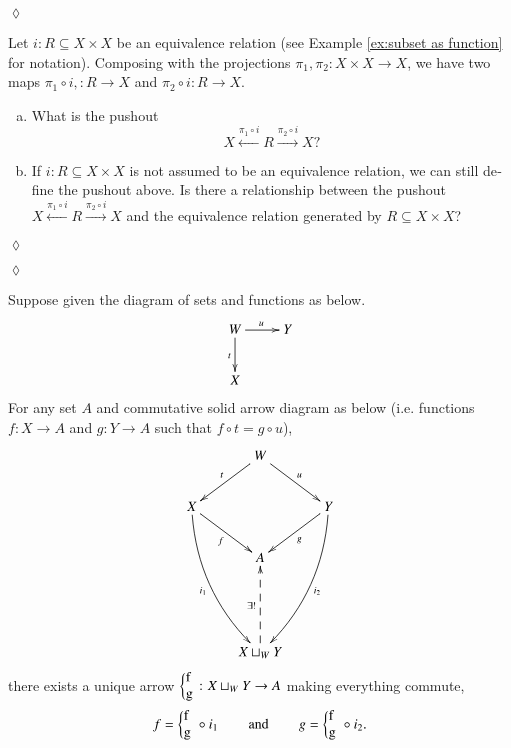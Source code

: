 \documentclass[a4paper]{book}
\def\hsp{\hspace{.3in}}
\def\to{\rightarrow}
\def\taking{\colon}
\def\ss{\subseteq}
\newcommand{\To}[1]{\xrightarrow{#1}}
\newcommand{\From}[1]{\xleftarrow{#1}}
\newcommand{\coprodmap}[2]{{\left\{\parbox{.1in}{#1\\#2}\right.}}
\newcommand{\po}[3]{\coprodmap{#1}{#2}}
\theoremstyle{myth}
\newtheorem{lemmaENG}[envENG]{\begin{english}Lemma\end{english}}
\newtheorem{excENG}[envENG]{\begin{english}Exercise\end{english}}
\newenvironment{exerciseENG}{\begin{excENG}}{\hspace*{\fill}$\lozenge$\end{excENG}}
\newtheorem{lemmaRUS}[envRUS]{\begin{russian}Лемма\end{russian}}
\newtheorem{excRUS}[envRUS]{\begin{russian}Упражнение\end{russian}}
\newenvironment{exerciseRUS}{\begin{excRUS}}{\hspace*{\fill}$\lozenge$\end{excRUS}}
\def\sexc{\begin{enumerate}[a.)]\setlength{\itemsep}{.1cm}\setlength{\parskip}{.1cm}\item}
\def\next{\item}
\def\endsexc{\end{enumerate}}
\begin{document}
\begin{english}
\begin{exerciseRUS}
\begin{russian} \end{russian}
\end{exerciseRUS}

\begin{exerciseENG}
Let $i\taking R\ss X\times X$ be an equivalence relation (see Example \ref{ex:subset as function} for notation). Composing with the projections $\pi_1,\pi_2\taking X\times X\to X$, we have two maps $\pi_1\circ i,\taking R\to X$ and $\pi_2\circ i\taking R\to X$. 
\sexc What is the pushout $$X\From{\pi_1\circ i}R\To{\pi_2\circ i}X?$$ 
\next If $i\taking R\ss X\times X$ is not assumed to be an equivalence relation, we can still define the pushout above. Is there a relationship between the pushout $X\From{\pi_1\circ i}R\To{\pi_2\circ i}X$ and the equivalence relation generated by $R\ss X\times X$?
\endsexc
\end{exerciseENG}

\begin{exerciseRUS}
\begin{russian} \end{russian}
\end{exerciseRUS}

\begin{lemmaENG}\label{lemma:up for po}
Suppose given the diagram of sets and functions as below.
\begin{align*}
\xymatrix{W\ar[r]^u\ar[d]_t&Y\\
X}
\end{align*}
For any set $A$ and commutative solid arrow diagram as below (i.e. functions $f\taking X\to A$ and $g\taking Y\to A$ such that $f\circ t=g\circ u$), 
\begin{align}\label{dia:universal property of po}
\xymatrix{
&W\ar[dr]^u\ar[dl]_t\\
X\ar@/_1pc/[dddr]_{i_1}\ar[rd]_f&&Y\ar@/^1pc/[dddl]^{i_2}\ar[dl]^g\\
&A\\\\
&X\sqcup_WY\ar@{-->}[uu]^{\exists!}
}
\end{align}
there exists a unique arrow $\po{f}{g}{W}\taking X\sqcup_WY\to A$ making everything commute, $$f=\po{f}{g}{W}\circ i_1\hsp\text{and}\hsp g=\po{f}{g}{W}\circ i_2.$$
\end{lemmaENG}

\begin{lemmaRUS}\label{lemma:up for po}
\begin{russian} \end{russian}
\end{lemmaRUS}


\end{english}
\end{document}
